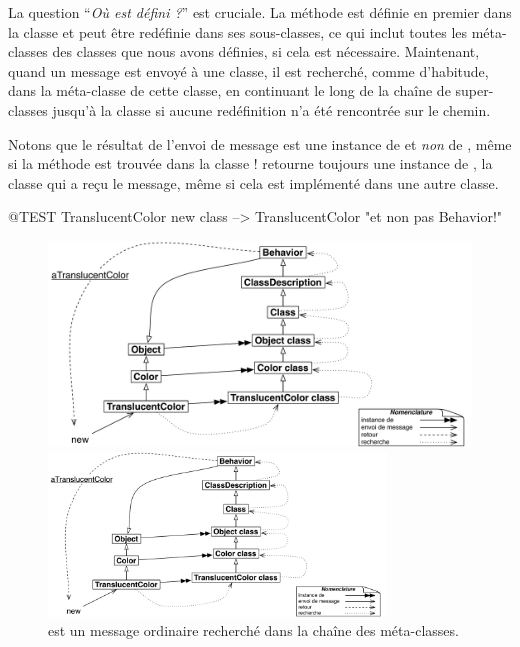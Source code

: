 \documentclass[a4paper,10pt,twoside]{book}
\begin{document}
La question ``\emph{Où est défini ?}'' est cruciale.
La m\'ethode  est définie en premier dans la classe  et peut être redéfinie dans ses sous-classes, ce qui inclut toutes les méta-classes des classes que nous avons définies, si cela est nécessaire.
Maintenant, quand un message  est envoyé à une classe, il est recherché, comme d'habitude, dans la méta-classe de cette classe, en continuant le long de la chaîne de super-classes jusqu'à la classe  si aucune redéfinition n'a été rencontrée sur le chemin.

Notons que le résultat de l'envoi de message  est une instance de    et \emph{non} de , même si la méthode est trouvée dans la classe !   retourne toujours une instance de \self, la classe qui a reçu le message, même si cela est implémenté dans une autre classe.

\begin{code}{@TEST}
TranslucentColor new class --> TranslucentColor    "et non pas Behavior!"
\end{code}

\begin{center}
\begin{figure}
\ifluluelse
	{\centerline{\includegraphics[width=\textwidth]{TranslucentSendingNew}}}
	{\centerline{\includegraphics[width=0.8\textwidth]{TranslucentSendingNew}}}
\caption{ est un message ordinaire recherché dans la chaîne des méta-classes.\label{fig:sendingnew}}
\end{figure}
\end{center}
\end{document}
